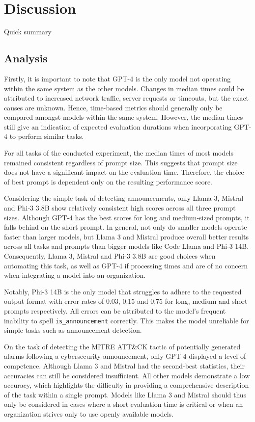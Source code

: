 \section{Discussion}
\label{sec:discussion}

Quick summary

\subsection{Analysis}
\label{subsec:analysis}

Firstly, it is important to note that GPT-4 is the only model not operating within the same system as the other models.
Changes in median times could be attributed to increased network traffic, server requests or timeouts, but the exact
causes are unknown.
Hence, time-based metrics should generally only be compared amongst models within the same system.
However, the median times still give an indication of expected evaluation durations when incorporating GPT-4 to perform
similar tasks.
%

For all tasks of the conducted experiment, the median times of most models remained consistent regardless of prompt
size.
This suggests that prompt size does not have a significant impact on the evaluation time.
Therefore, the choice of best prompt is dependent only on the resulting performance score.

Considering the simple task of detecting announcements, only Llama 3, Mistral and Phi-3 3.8B show relatively consistent
high scores across all three prompt sizes.
Although GPT-4 has the best scores for long and medium-sized prompts, it falls behind on the short prompt.
In general, not only do smaller models operate faster than larger models, but Llama 3 and Mistral produce overall better
results across all tasks and prompts than bigger models like Code Llama and Phi-3 14B\@.
Consequently, Llama 3, Mistral and Phi-3 3.8B are good choices when automating this task, as well as GPT-4 if processing
times and are of no concern when integrating a model into an organization.

Notably, Phi-3 14B is the only model that struggles to adhere to the requested output format with error rates of 0.03,
0.15 and 0.75 for long, medium and short prompts respectively.
All errors can be attributed to the model's frequent inability to spell \texttt{is\_announcement} correctly.
This makes the model unreliable for simple tasks such as announcement detection.
%

On the task of detecting the MITRE ATT\&CK tactic of potentially generated alarms following a cybersecurity
announcement, only GPT-4 displayed a level of competence.
Although Llama 3 and Mistral had the second-best statistics, their accuracies can still be considered insufficient.
All other models demonstrate a low accuracy, which highlights the difficulty in providing a comprehensive description
of the task within a single prompt.
Models like Llama 3 and Mistral should thus only be considered in cases where a short evaluation time is critical or
when an organization strives only to use openly available models.

